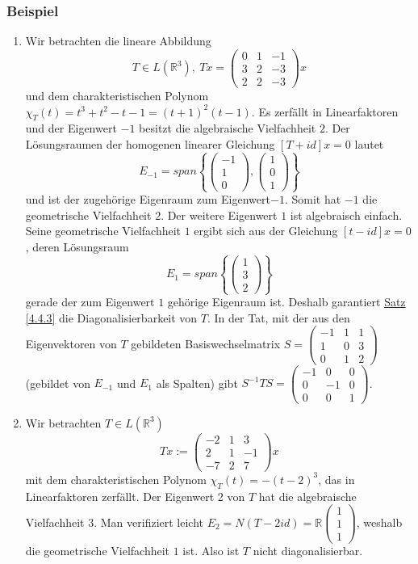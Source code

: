 \subsubsection{Beispiel}
\numbers
\begin{enumerate}
\item Wir betrachten die lineare Abbildung 
\[T\in L(\mathbb{R}^3),\ Tx=\begin{pmatrix}0 & 1 & -1\\ 3 & 2 & -3 \\ 2 & 2 & -3\end{pmatrix}x\]
und dem charakteristischen Polynom $\chi _T(t)=t^3+t^2-t-1=(t+1)^2(t-1)$.  Es zerfällt in Linearfaktoren und der Eigenwert $-1$ besitzt die algebraische Vielfachheit $2$.  Der Lösungsraumen der homogenen linearer Gleichung $[T+id]x=0$ lautet
\[E_{-1}=span\left\{\begin{pmatrix}-1\\ 1\\ 0\end{pmatrix},\begin{pmatrix}1\\ 0\\ 1\end{pmatrix}\right\}\]
und ist der zugehörige Eigenraum zum Eigenwert$-1$.  Somit hat $-1$ die geometrische Vielfachheit $2$.  Der weitere Eigenwert $1$ ist algebraisch einfach.  Seine geometrische Vielfachheit $1$ ergibt sich aus der Gleichung $[t-id]x=0$, deren Lösungsraum
\[E_1=span\left\{\begin{pmatrix}1\\ 3\\ 2\end{pmatrix}\right\}\]
gerade der zum Eigenwert $1$ gehörige Eigenraum ist.  Deshalb garantiert \hyperref[4.4.3]{Satz \ref{4.4.3}} die Diagonalisierbarkeit von $T$.  In der Tat, mit der aus den Eigenvektoren von $T$ gebildeten Basiswechselmatrix $S=\begin{pmatrix}-1 & 1 & 1\\ 1 & 0 & 3 \\ 0 & 1 & 2\end{pmatrix}$ (gebildet von $E_{-1}$ und $E_1$ als Spalten) gibt $S^{-1}TS=\begin{pmatrix}-1 & 0 & 0 \\0 & -1 & 0\\ 0 & 0 & 1\end{pmatrix}$.
\item Wir betrachten $T\in L(\mathbb{R}^3)$
\[Tx:=\begin{pmatrix}-2 & 1 & 3\\ 2 & 1 & -1\\ -7 & 2 & 7\end{pmatrix}x\]
mit dem charakteristischen Polynom $\chi _T(t)=-(t-2)^3$, das in Linearfaktoren zerfällt.  Der Eigenwert 2 von $T$ hat die algebraische Vielfachheit $3$.  Man verifiziert leicht $E_2=N(T-2id)=\mathbb{R}\begin{pmatrix}1\\ 1\\ 1\end{pmatrix}$,
weshalb die geometrische Vielfachheit $1$ ist.  Also ist $T$ nicht diagonalisierbar.
\end{enumerate}
